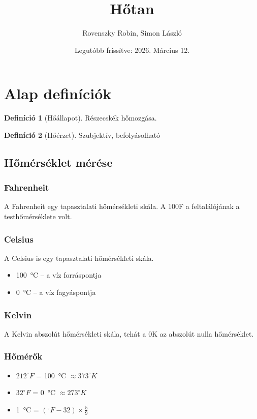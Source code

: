 \documentclass{article}
\title{Hőtan}
\author{Rovenszky Robin, Simon László}
\date{Legutóbb frissítve: 2026. Március 12.}
\theoremstyle{definition}
\newtheorem{definition}{Definíció}[section]
\begin{document}
\maketitle
\tableofcontents
\newpage

\section{Alap definíciók}
\begin{definition}[Hőállapot]
    Részecskék hőmozgása.
\end{definition}

\begin{definition}[Hőérzet]
    Szubjektív, befolyásolható
\end{definition}

\subsection{Hőmérséklet mérése}

\subsubsection{Fahrenheit}
A Fahrenheit egy tapasztalati hőmérsékleti skála. A 100F a feltalálójának a testhőmérséklete volt.
\subsubsection{Celsius}
A Celsius is egy tapasztalati hőmérsékleti skála.
\begin{itemize}
    \item \SI{100}{\degreeCelsius} -- a víz forráspontja
    \item \SI{0}{\degreeCelsius} -- a víz fagyáspontja
\end{itemize}
\subsubsection{Kelvin}
A Kelvin abszolút hőmérsékleti skála, tehát a 0K az abszolút nulla hőmérséklet.
\subsubsection{Hőmérők}
\begin{itemize}
    \item $212^\circ F$ = \SI{100}{\degreeCelsius} $\approx 373^\circ K$
    \item $32^\circ F$ = \SI{0}{\degreeCelsius} $\approx 273^\circ K$
    \item \SI{1}{\degreeCelsius} = $(^\circ F-32) \times \frac{5}{9}$
\end{itemize}
\end{document}

